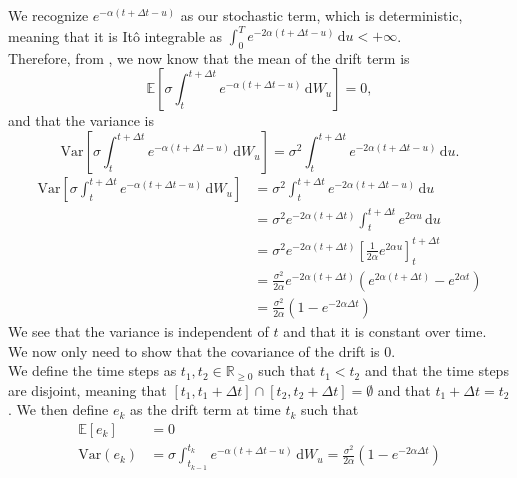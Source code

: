 We recognize $e^{-\alpha (t+\Delta t-u)} $ as our stochastic term, which is deterministic, meaning
that it is Itô integrable as $\int_{0}^{T}e^{-2\alpha (t+\Delta t-u)} \, \mathrm{d}u < + \infty$. \\
Therefore, from \textcite[Thm.~1.9.1]{iacus2008},
we now know that the mean of the drift term is
\begin{equation}
    \mathbb{E}\left[\sigma \int_{t}^{t+\Delta t} e^{-\alpha (t+\Delta t-u)} \, \mathrm{d}W_u\right] = 0,
\end{equation}
and that the variance is
\begin{equation}
    \text{Var}\left[\sigma \int_{t}^{t+\Delta t} e^{-\alpha (t+\Delta t-u)} \, \mathrm{d}W_u\right] = 
    \sigma^2 \int_{t}^{t+\Delta t} e^{-2\alpha (t+\Delta t-u)} \, \mathrm{d}u .
\end{equation}
\begin{subequations}
\begin{align}
    \text{Var}\left[\sigma \int_{t}^{t+\Delta t} e^{-\alpha (t+\Delta t-u)} \, \mathrm{d}W_u\right]
    &= \sigma^2 \int_{t}^{t+\Delta t} e^{-2\alpha (t+\Delta t-u)} \, \mathrm{d}u \\
    &= \sigma^2 e^{-2\alpha (t+\Delta t)} \int_{t}^{t+\Delta t} e^{2\alpha u} \, \mathrm{d}u \\
    &= \sigma^2 e^{-2\alpha (t+\Delta t)} \left[\frac{1}{2\alpha} e^{2\alpha u}\right]_{t}^{t+\Delta t} \\
    &= \frac{\sigma^2}{2\alpha} e^{-2\alpha (t+\Delta t)} \left(e^{2\alpha (t+\Delta t)} - e^{2\alpha t}\right) \\
    &= \frac{\sigma^2}{2\alpha}\left(1 - e^{-2\alpha \Delta t}\right)
\end{align}
\end{subequations}
We see that the variance is independent of $t$ and 
that it is constant over time. \\
We now only need to show that the covariance of the drift is 0. \\
We define the time steps as $t_1, t_2 \in \mathbb{R}_{\geq 0}$ such that $t_1 < t_2$ and that the time steps are disjoint, meaning that $[t_1, t_1 + \Delta t] \cap [t_2, t_2 + \Delta t] = \emptyset$ 
and that $t_1 + \Delta t = t_2$.
We then define $e_k$ as the drift term at time $t_k$ such that
\begin{equation}
\begin{aligned}
    \mathbb{E}\left[e_k\right] &= 0 \\ 
    \text{Var}(e_k) &= \sigma \int_{t_{k-1}}^{t_k} e^{-\alpha (t+\Delta t-u)} \, \mathrm{d}W_u = \frac{\sigma^2}{2\alpha}\left(1 - e^{-2\alpha \Delta t}\right)
\end{aligned}
\end{equation}


